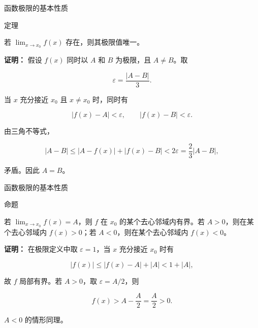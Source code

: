 \documentclass[aspectratio=169,10pt,fontset=fandol]{ctexbeamer}
\begin{document}
\begin{frame}[t,fragile]{函数极限的基本性质}
\normalsize
\begin{block}{定理}
{\normalsize


若 \(\lim_{x\to x_0}f(x)\) 存在，则其极限值唯一。


}
\end{block}
\pause
{\normalsize
\textbf{证明：}
假设 \(f(x)\) 同时以 \(A\) 和 \(B\) 为极限，且 \(A\neq B\)。取

\[

\varepsilon=\frac{|A-B|}{3}.

\]

当 \(x\) 充分接近 \(x_0\) 且 \(x\neq x_0\) 时，同时有

\[

|f(x)-A|<\varepsilon,\qquad |f(x)-B|<\varepsilon.

\]

由三角不等式，

\[

|A-B|\leq |A-f(x)|+|f(x)-B|<2\varepsilon=\frac23|A-B|,

\]

矛盾。因此 \(A=B\)。


}
\end{frame}
\begin{frame}[t,fragile]{函数极限的基本性质}
\normalsize
\begin{block}{命题}
{\normalsize


若 \(\lim_{x\to x_0}f(x)=A\)，则 \(f\) 在 \(x_0\) 的某个去心邻域内有界。若 \(A>0\)，则在某个去心邻域内 \(f(x)>0\)；若 \(A<0\)，则在某个去心邻域内 \(f(x)<0\)。


}
\end{block}
\pause
{\normalsize
\textbf{证明：}
在极限定义中取 \(\varepsilon=1\)，当 \(x\) 充分接近 \(x_0\) 时有

\[

|f(x)|\leq |f(x)-A|+|A|<1+|A|,

\]

故 \(f\) 局部有界。若 \(A>0\)，取 \(\varepsilon=A/2\)，则

\[

f(x)>A-\frac A2=\frac A2>0.

\]

\(A<0\) 的情形同理。


}
\end{frame}
\end{document}
